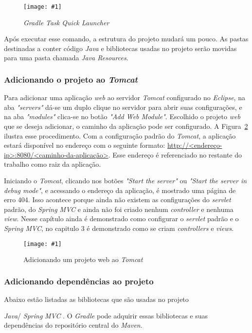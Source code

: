 \documentclass[a4paper,12pt]{article}
\newcommand{\spring} {
\lang{Java}/\est{Spring} \sigla{MVC}
}
\newcommand{\figura}[3] {
	\begin{figure}[ht]
		\centering
		\texttt{[image: \#1]}
		\caption{#2}
		\label{#3}
	\end{figure}
	\FloatBarrier
}
\newcommand{\est}[1] {
\textit{#1}}
\newcommand{\sigla}[1] {
\textit{#1}}
\newcommand{\lang}[1] {
\textit{#1}}
\begin{document}
\figura{gradlecommand.png}{\est{Gradle Task Quick Launcher}}{fig:13}

Após executar esse comando, a estrutura do projeto mudará um pouco. As pastas destinadas a conter código \lang{Java} e bibliotecas usadas no projeto serão movidas para uma pasta chamada \est{Java Resources}.

\subsubsection{Adicionando o projeto ao \est{Tomcat}}

Para adicionar uma aplicação \est{web} ao servidor \est{Tomcat} configurado no \est{Eclipse}, na aba \est{"servers"} dá-se um duplo clique no servidor para abrir suas configurações, e na aba \est{"modules"} clica-se no botão \est{"Add Web Module"}. Escolhido o projeto \est{web} que se deseja adicionar, o caminho da aplicação pode ser configurado. A Figura~\ref{fig:14} ilustra esse procedimento. Com a configuração padrão do \est{Tomcat}, a aplicação estará disponível no endereço com o seguinte formato: \url{http://<endereço-ip>:8080/<caminho-da-aplicação>}. Esse endereço é referenciado no restante do trabalho como raiz da aplicação.

Iniciando o \est{Tomcat}, clicando nos botões \est{"Start the server"} ou \est{"Start the server in debug mode"}, e acessando o endereço da aplicação, é mostrado uma página de erro 404. Isso acontece porque ainda não existem as configurações do \est{servlet} padrão, do \est{Spring MVC} e ainda não foi criado nenhum \est{controller} e nenhuma \est{view}. Nesse capítulo ainda é demonstrado como configurar o \est{servlet} padrão e o \est{Spring MVC}, no capitulo 3 é demonstrado como se criam \est{controllers} e \est{views}.

\figura{tomcatproject.png}{Adicionando um projeto web ao \est{Tomcat}}{fig:14}

\subsubsection{Adicionando dependências ao projeto}

Abaixo estão listadas as bibliotecas que são usadas no projeto \spring. O \est{Gradle} pode adquirir essas bibliotecas e suas dependências do repositório central do \est{Maven}.
\end{document}
